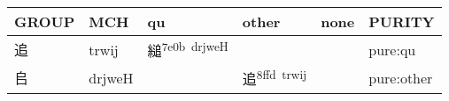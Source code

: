 \documentclass[14pt,a4paper]{scrartcl}
\begin{document}
\begin{longtable}[c]{@{}llllll@{}}
\toprule
\begin{minipage}[b]{0.14\columnwidth}\raggedright\strut
GROUP
\strut\end{minipage} &
\begin{minipage}[b]{0.14\columnwidth}\raggedright\strut
MCH
\strut\end{minipage} &
\begin{minipage}[b]{0.14\columnwidth}\raggedright\strut
qu
\strut\end{minipage} &
\begin{minipage}[b]{0.14\columnwidth}\raggedright\strut
other
\strut\end{minipage} &
\begin{minipage}[b]{0.14\columnwidth}\raggedright\strut
none
\strut\end{minipage} &
\begin{minipage}[b]{0.14\columnwidth}\raggedright\strut
PURITY
\strut\end{minipage}\tabularnewline
\midrule
\endhead
\begin{minipage}[t]{0.14\columnwidth}\raggedright\strut
追
\strut\end{minipage} &
\begin{minipage}[t]{0.14\columnwidth}\raggedright\strut
trwij
\strut\end{minipage} &
\begin{minipage}[t]{0.14\columnwidth}\raggedright\strut
縋\textsuperscript{7e0b~drjweH}
\strut\end{minipage} &
\begin{minipage}[t]{0.14\columnwidth}\raggedright\strut
\strut\end{minipage} &
\begin{minipage}[t]{0.14\columnwidth}\raggedright\strut
\strut\end{minipage} &
\begin{minipage}[t]{0.14\columnwidth}\raggedright\strut
pure:qu
\strut\end{minipage}\tabularnewline
\begin{minipage}[t]{0.14\columnwidth}\raggedright\strut
𠂤
\strut\end{minipage} &
\begin{minipage}[t]{0.14\columnwidth}\raggedright\strut
drjweH
\strut\end{minipage} &
\begin{minipage}[t]{0.14\columnwidth}\raggedright\strut
\strut\end{minipage} &
\begin{minipage}[t]{0.14\columnwidth}\raggedright\strut
追\textsuperscript{8ffd~trwij}
\strut\end{minipage} &
\begin{minipage}[t]{0.14\columnwidth}\raggedright\strut
\strut\end{minipage} &
\begin{minipage}[t]{0.14\columnwidth}\raggedright\strut
pure:other
\strut\end{minipage}\tabularnewline
\bottomrule
\end{longtable}
\end{document}
